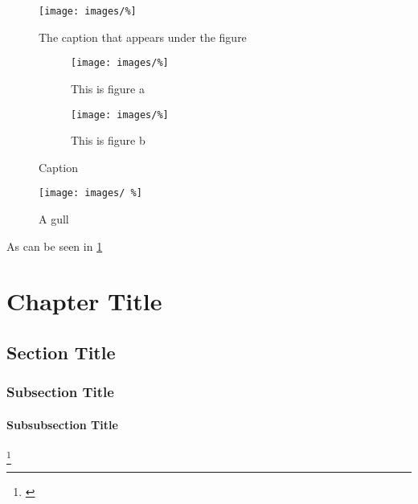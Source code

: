 \begin{figure}[H]
\centering
\texttt{[image: images/\%]}
\vskip10pt
\caption[The caption that appears in the list of figures]{The caption that appears under the figure}
\label{fig:exam}
\end{figure}

\begin{figure}[H]
\centering
\begin{subfigure}[t]{0.49\textwidth}
\centering
\texttt{[image: images/\%]}
\caption{This is figure a}
\label{fig:figureA}
\end{subfigure}
\begin{subfigure}[t]{0.49\textwidth}
\centering
\texttt{[image: images/\%]}
\caption{This is figure b}
\label{fig:figureB}
\end{subfigure}
\caption{Caption}
\end{figure}

\begin{wrapfigure}{r}{0.5\textwidth}
\begin{center}
\texttt{[image: images/ \%]}
\end{center}
\caption{A gull}
\end{wrapfigure}

As can be seen in \cref{fig:exam}\\
\chapter{Chapter Title}
\label{ch:Chapter Title}

\section{Section Title}
\label{sec:Section Title}

\subsection{Subsection Title}
\label{subsec:Subsection Title}

\subsubsection{Subsubsection Title}
\label{bb:Subsubsection Title}

\footnote{\cite{aa}}
\cite{aa,bb}
